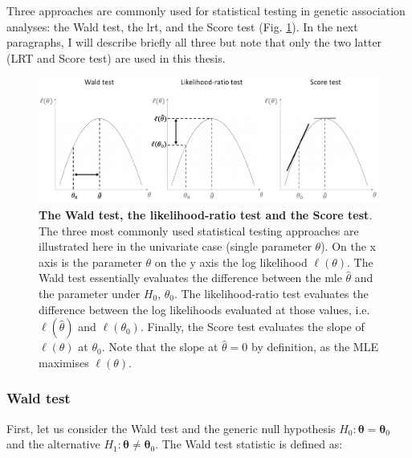 
\vspace{5mm}

Three approaches are commonly used for statistical testing in genetic association analyses: the Wald test, the \gls{lrt}, and the Score test (Fig. \ref{fig:hypothesis_tests}).
In the next paragraphs, I will describe briefly all three but note that only the two latter (LRT and Score test) are used in this thesis.

\begin{figure}[h]
\centering
\includegraphics[width=15cm]{Chapter2/Fig/wald_lrt_score_tests.png}
\caption[\textbf{Wald, LRT and Score test}]{\textbf{The Wald test, the likelihood-ratio test and the Score test}.\\
The three most commonly used statistical testing approaches are illustrated here in the univariate case (single parameter $\theta$). 
On the x axis is the parameter $\theta$ on the y axis the log likelihood $\ell(\theta)$.
The Wald test essentially evaluates the difference between the \gls{mle} $\hat{\theta}$ and the parameter under $H_0$, $\theta_0$.
The likelihood-ratio test evaluates the difference between the log likelihoods evaluated at those values, i.e. $\ell(\hat{\theta})$ and $\ell(\theta_0)$.
Finally, the Score test evaluates the slope of $\ell(\theta)$ at $\theta_0$. Note that the slope at $\hat{\theta}=0$ by definition, as the MLE maximises $\ell(\theta)$.}
\label{fig:hypothesis_tests}
\end{figure}

\subsubsection{Wald test}

First, let us consider the Wald test and the generic null hypothesis $H_0: \boldsymbol{\theta} = \boldsymbol{\theta}_0$ and the alternative $H_1: \boldsymbol{\theta} \neq \boldsymbol{\theta}_0$.
The Wald test statistic is defined as:

